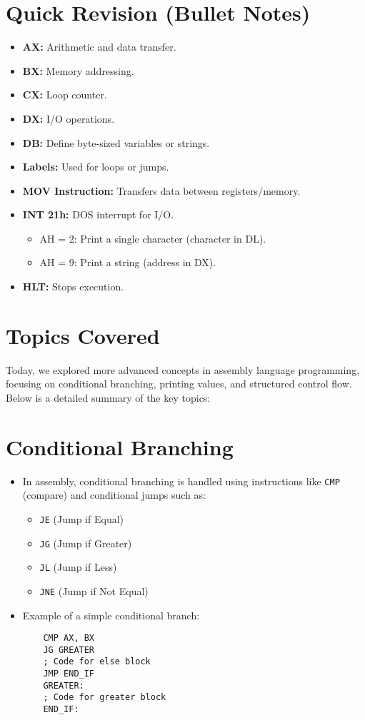 \documentclass[a4paper,12pt]{article}
\begin{document}
\section*{Quick Revision (Bullet Notes)}
\begin{itemize}
    \item \textbf{AX:} Arithmetic and data transfer.
    \item \textbf{BX:} Memory addressing.
    \item \textbf{CX:} Loop counter.
    \item \textbf{DX:} I/O operations.
    \item \textbf{DB:} Define byte-sized variables or strings.
    \item \textbf{Labels:} Used for loops or jumps.
    \item \textbf{MOV Instruction:} Transfers data between registers/memory.
    \item \textbf{INT 21h:} DOS interrupt for I/O.
    \begin{itemize}
        \item AH = 2: Print a single character (character in DL).
        \item AH = 9: Print a string (address in DX).
    \end{itemize}
    \item \textbf{HLT:} Stops execution.
\end{itemize}
\newpage
\section*{Topics Covered}

Today, we explored more advanced concepts in assembly language programming, focusing on conditional branching, printing values, and structured control flow. Below is a detailed summary of the key topics:

\section{Conditional Branching}
\begin{itemize}
    \item In assembly, conditional branching is handled using instructions like \texttt{CMP} (compare) and conditional jumps such as:
    \begin{itemize}
        \item \texttt{JE} (Jump if Equal)
        \item \texttt{JG} (Jump if Greater)
        \item \texttt{JL} (Jump if Less)
        \item \texttt{JNE} (Jump if Not Equal)
    \end{itemize}
    \item Example of a simple conditional branch:
    \begin{verbatim}
    CMP AX, BX
    JG GREATER
    ; Code for else block
    JMP END_IF
    GREATER:
    ; Code for greater block
    END_IF:
    \end{verbatim}
\end{itemize}
\end{document}
